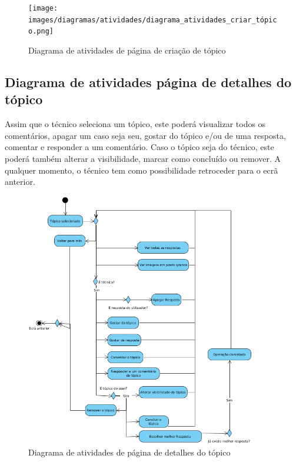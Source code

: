 \begin{figure}[htb]
    \centering
    \texttt{[image: images/diagramas/atividades/diagrama\_atividades\_criar\_tópico.png]}
    \caption{Diagrama de atividades de página de criação de tópico}
    \label{fig:37}
\end{figure}

\newpage

\subsection{Diagrama de atividades página de detalhes do tópico}

Assim que o técnico seleciona um tópico, este poderá visualizar todos os comentários, apagar um caso seja seu, gostar do tópico e/ou de uma resposta, comentar e responder a um comentário. Caso o tópico seja do técnico, este poderá também alterar a visibilidade, marcar como concluído ou remover. A qualquer momento, o técnico tem como possibilidade retroceder para o ecrã anterior.

\begin{figure}[htb]
    \centering
    \includegraphics[width=0.9\textwidth]{images/diagramas/atividades/diagrama_atividades_detalhes_topico.png}
    \caption{Diagrama de atividades de página de detalhes do tópico}
    \label{fig:38}
\end{figure}


